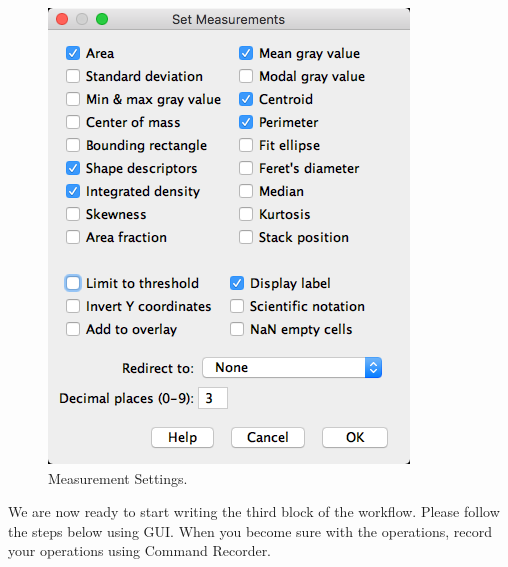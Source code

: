\begin{figure}[!ht]
\begin{center}
\includegraphics[scale=0.5]{fig/SetMeasurements.png}
\caption{Measurement Settings.}
\label{fig:MeasSetting}
\end{center}
\end{figure}

We are now ready to start writing the third block of the workflow. Please follow the steps below using GUI. When you become sure with the operations, record your operations using Command Recorder.   

